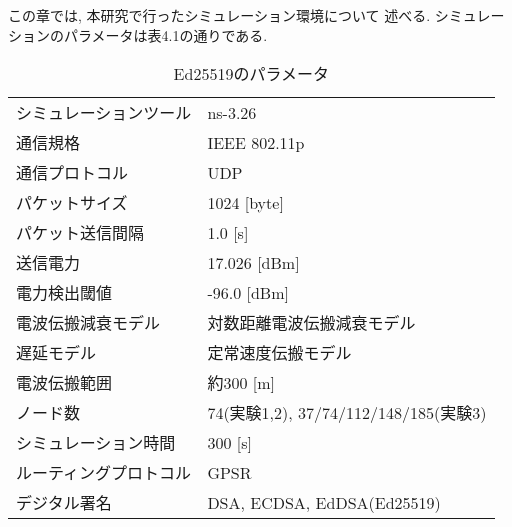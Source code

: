 この章では, 本研究で行ったシミュレーション環境について
述べる. シミュレーションのパラメータは表4.1の通りである.
\setlength{\tabcolsep}{30pt}
\begin{longtable}{ll}
  \caption{Ed25519のパラメータ}
  \endfirsthead
  \hline
  シミュレーションツール & ns-3.26 \\
  通信規格 & IEEE 802.11p \\
  通信プロトコル & UDP \\
  パケットサイズ & 1024 [byte] \\
  パケット送信間隔 & 1.0 [s] \\
  送信電力 & 17.026 [dBm] \\
  電力検出閾値 & -96.0 [dBm] \\
  電波伝搬減衰モデル & 対数距離電波伝搬減衰モデル \\
  遅延モデル & 定常速度伝搬モデル \\
  電波伝搬範囲 & 約300 [m] \\
  ノード数 & 74(実験1,2), 37/74/112/148/185(実験3) \\
  シミュレーション時間 & 300 [s] \\
  ルーティングプロトコル & GPSR \\
  デジタル署名 & DSA, ECDSA, EdDSA(Ed25519) \\ \hline
\end{longtable}
\vspace{3em}


\vspace{2em}

\vspace{2em}

\vspace{1em}

\vspace{2em}

\vspace{2em}

